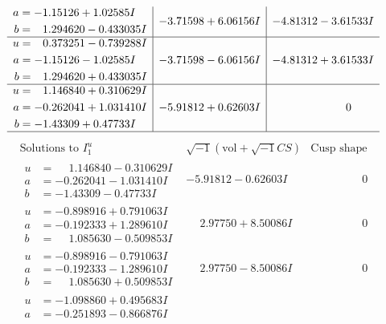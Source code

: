 \documentclass[1p]{elsarticle_modified}
\theoremstyle{definition}
\newcommand{\I}{\sqrt{-1}}
\begin{document}
$$\begin{array}{c|c|c}
\begin{aligned}
a &= -1.15126 + 1.02585 I \\
b &= \phantom{-}1.294620 - 0.433035 I\end{aligned}
 & -3.71598 + 6.06156 I & -4.81312 - 3.61533 I \\ \hline\begin{aligned}
u &= \phantom{-}0.373251 - 0.739288 I \\
a &= -1.15126 - 1.02585 I \\
b &= \phantom{-}1.294620 + 0.433035 I\end{aligned}
 & -3.71598 - 6.06156 I & -4.81312 + 3.61533 I \\ \hline\begin{aligned}
u &= \phantom{-}1.146840 + 0.310629 I \\
a &= -0.262041 + 1.031410 I \\
b &= -1.43309 + 0.47733 I\end{aligned}
 & -5.91812 + 0.62603 I & \phantom{-0.000000 } 0\\
 \hline 
 \end{array}$$\newpage$$\begin{array}{c|c|c}  
\text{Solutions to }I^u_{1}& \I (\text{vol} + \sqrt{-1}CS) & \text{Cusp shape}\\
 \hline 
\begin{aligned}
u &= \phantom{-}1.146840 - 0.310629 I \\
a &= -0.262041 - 1.031410 I \\
b &= -1.43309 - 0.47733 I\end{aligned}
 & -5.91812 - 0.62603 I & \phantom{-0.000000 } 0 \\ \hline\begin{aligned}
u &= -0.898916 + 0.791063 I \\
a &= -0.192333 + 1.289610 I \\
b &= \phantom{-}1.085630 - 0.509853 I\end{aligned}
 & \phantom{-}2.97750 + 8.50086 I & \phantom{-0.000000 } 0 \\ \hline\begin{aligned}
u &= -0.898916 - 0.791063 I \\
a &= -0.192333 - 1.289610 I \\
b &= \phantom{-}1.085630 + 0.509853 I\end{aligned}
 & \phantom{-}2.97750 - 8.50086 I & \phantom{-0.000000 } 0 \\ \hline\begin{aligned}
u &= -1.098860 + 0.495683 I \\
a &= -0.251893 - 0.866876 I \\

\end{aligned}
\end{array}$$
\end{document}
